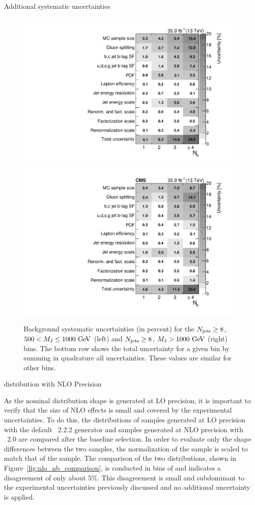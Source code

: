 \begin{section}{Additional systematic uncertainties}
\begin{figure}[tbp!]
\begin{center}
\includegraphics[angle=0,width=0.45\columnwidth]{fig/table_bkg_systs_bin20.pdf}
\includegraphics[angle=0,width=0.45\columnwidth]{fig/table_bkg_systs_bin21.pdf}
\end{center}
\caption{Background systematic uncertainties (in percent) for the $N_{\mathrm{jets}} \geq 8$, $500 < M_{\mathrm{J}} \leq 1000~\mathrm{Ge\kern -0.1em V}$ (left) and $N_{\mathrm{jets}} \geq 8$, $M_{\mathrm{J}} > 1000~\mathrm{Ge\kern -0.1em V}$ (right) bins.
The bottom row shows the total uncertainty for a given \Nb bin by summing in quadrature all uncertainties.
These values are similar for other bins.}
\label{fig:bkg_sys_tables}
\end{figure}

\begin{subsection}{\Nb distribution with NLO Precision}

As the nominal \Nb distribution shape is generated at LO precision, it is important to verify that the size of NLO effects is small and covered by the experimental uncertainties.
To do this, the \Nb distributions of \ttbar samples generated at LO precision with the default \MGatNLO~2.2.2 generator and samples generated at NLO precision with \POWHEG~2.0 are compared after the baseline selection.
In order to evaluate only the shape differences between the two samples, the normalization of the \MGatNLO sample is scaled to match that of the \POWHEG sample.
The comparison of the two distributions, shown in Figure~\ref{fig:nlo_nb_comparison}, is conducted in bins of \Njets and indicates a disagreement of only about $5\%$.
This disagreement is small and subdominant to the experimental uncertainties previously discussed and no additional uncertainty is applied.


\end{subsection}
\end{section}
